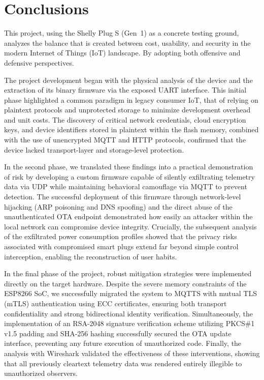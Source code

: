 \chapter*{Conclusions}

This project, using the Shelly Plug S (Gen~1) as a concrete testing ground, analyzes the balance that is created between cost, usability, and security in the modern Internet of Things (IoT) landscape. By adopting both offensive and defensive perspectives.

\medskip
\noindent The project development began with the physical analysis of the device and the extraction of its binary firmware via the exposed UART interface. This initial phase highlighted a common paradigm in legacy consumer IoT, that of relying on plaintext protocols and unprotected storage to minimize development overhead and unit costs. The discovery of critical network credentials, cloud encryption keys, and device identifiers stored in plaintext within the flash memory, combined with the use of unencrypted MQTT and HTTP protocols, confirmed that the device lacked transport-layer and storage-level protection. 

\medskip
\noindent In the second phase, we translated these findings into a practical demonstration of risk by developing a custom firmware capable of silently exfiltrating telemetry data via UDP while maintaining behavioral camouflage via MQTT to prevent detection. The successful deployment of this firmware through network-level hijacking (ARP poisoning and DNS spoofing) and the direct abuse of the unauthenticated OTA endpoint demonstrated how easily an attacker within the local network can compromise device integrity. Crucially, the subsequent analysis of the exfiltrated power consumption profiles showed that the privacy risks associated with compromised smart plugs extend far beyond simple control interception, enabling the reconstruction of user habits.

\medskip
\noindent In the final phase of the project, robust mitigation strategies were implemented directly on the target hardware. Despite the severe memory constraints of the ESP8266 SoC, we successfully migrated the system to MQTTS with mutual TLS (mTLS) authentication using ECC certificates, ensuring both transport confidentiality and strong bidirectional identity verification. Simultaneously, the implementation of an RSA-2048 signature verification scheme utilizing PKCS\#1 v1.5 padding and SHA-256 hashing successfully secured the OTA update interface, preventing any future execution of unauthorized code. Finally, the analysis with Wireshark validated the effectiveness of these interventions, showing that all previously cleartext telemetry data was rendered entirely illegible to unauthorized observers.

